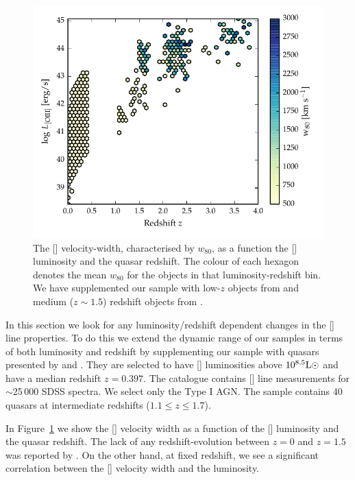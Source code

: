 \begin{figure}
    \includegraphics[width=\columnwidth]{figures/chapter04/oiii_luminosity_z_w80.pdf} 
    \caption[{The [] velocity-width, characterised by $w_{80}$, as a function the [] luminosity and the quasar redshift.}]{The [] velocity-width, characterised by $w_{80}$, as a function the [] luminosity and the quasar redshift. The colour of each hexagon denotes the mean $w_{80}$ for the objects in that luminosity-redshift bin. We have supplemented our sample with low-$z$ objects from \citet{zakamska14} and medium ($z\sim1.5$) redshift objects from \citet{harrison16}. }       
    \label{fig:oiii_luminosity_z_w80}
\end{figure}

In this section we look for any luminosity/redshift dependent changes in the [] line properties. 
To do this we extend the dynamic range of our samples in terms of both luminosity and redshift by supplementing our sample with quasars presented by \citet{mullaney13} and \citet{harrison16}. 
They are selected to have [] luminosities above $10^{8.5}{\rm L}\odot$ and have a median redshift $z=0.397$. 
The \citet{mullaney13} catalogue contains [] line measurements for $\sim$25\,000 \ac{SDSS} spectra. 
We select only the Type I \ac{AGN}. 
The \citet{harrison16} sample contains 40 quasars at intermediate redshifts ($1.1 \leq z \leq 1.7$).

In Figure~\ref{fig:oiii_luminosity_z_w80} we show the [] velocity width as a function of the [] luminosity and the quasar redshift. 
The lack of any redshift-evolution between $z=0$ and $z=1.5$ was reported by \citet{harrison16}.
On the other hand, at fixed redshift, we see a significant correlation between the [] velocity width and the luminosity. 

